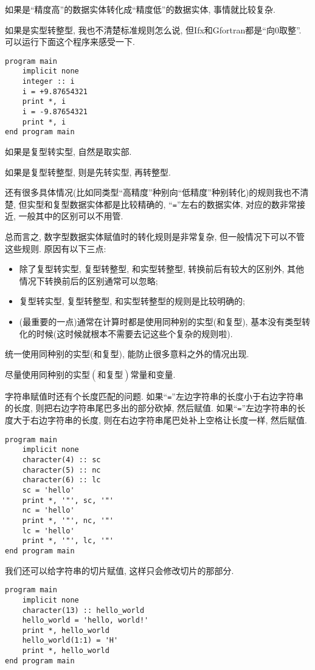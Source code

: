 如果是``精度高''的数据实体转化成``精度低''的数据实体, 事情就比较复杂.

如果是实型转整型, 我也不清楚标准规则怎么说, 但Ifx和Gfortran都是``向0取整''. 可以运行下面这个程序来感受一下.
\begin{lstlisting}
program main
    implicit none
    integer :: i
    i = +9.87654321
    print *, i
    i = -9.87654321
    print *, i
end program main
\end{lstlisting}

如果是复型转实型, 自然是取实部.

如果是复型转整型, 则是先转实型, 再转整型.

还有很多具体情况(比如同类型``高精度''种别向``低精度''种别转化)的规则我也不清楚, 但实型和复型数据实体都是比较精确的, ``\texttt{=}''左右的数据实体, 对应的数非常接近, 一般其中的区别可以不用管.

总而言之, 数字型数据实体赋值时的转化规则是非常复杂, 但一般情况下可以不管这些规则. 原因有以下三点:
\begin{itemize}
    \item 除了复型转实型, 复型转整型, 和实型转整型, 转换前后有较大的区别外, 其他情况下转换前后的区别通常可以忽略;
    \item 复型转实型, 复型转整型, 和实型转整型的规则是比较明确的;
    \item (最重要的一点)通常在计算时都是使用同种别的实型(和复型), 基本没有类型转化的时候(这时候就根本不需要去记这些个复杂的规则啦).
\end{itemize}

统一使用同种别的实型(和复型), 能防止很多意料之外的情况出现.

\begin{convention}\label{fortran_use_real}
    尽量使用同种别的实型$(\text{和复型})$常量和变量.
\end{convention}

字符串赋值时还有个长度匹配的问题. 如果``\texttt{=}''左边字符串的长度小于右边字符串的长度, 则把右边字符串尾巴多出的部分砍掉, 然后赋值. 如果``\texttt{=}''左边字符串的长度大于右边字符串的长度, 则在右边字符串尾巴处补上空格让长度一样, 然后赋值.
\begin{lstlisting}
program main
    implicit none
    character(4) :: sc
    character(5) :: nc
    character(6) :: lc
    sc = 'hello'
    print *, '"', sc, '"'
    nc = 'hello'
    print *, '"', nc, '"'
    lc = 'hello'
    print *, '"', lc, '"'
end program main
\end{lstlisting}
我们还可以给字符串的切片赋值, 这样只会修改切片的那部分.
\begin{lstlisting}
program main
    implicit none
    character(13) :: hello_world
    hello_world = 'hello, world!'
    print *, hello_world
    hello_world(1:1) = 'H'
    print *, hello_world
end program main
\end{lstlisting}

